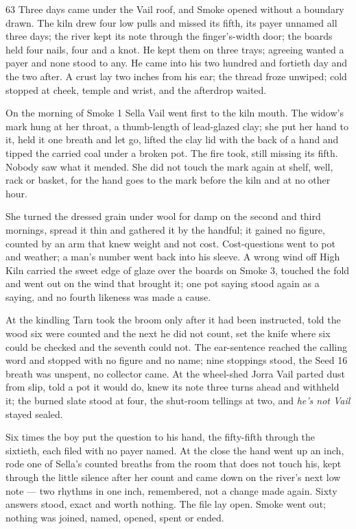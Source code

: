 \begin{CRchronicle}{63}
Three days came under the Vail roof, and Smoke opened without a boundary drawn. The kiln drew four low pulls and missed its fifth, its payer unnamed all three days; the river kept its note through the finger’s-width door; the boards held four nails, four and a knot. He kept them on three trays; agreeing wanted a payer and none stood to any. He came into his two hundred and fortieth day and the two after. A crust lay two inches from his ear; the thread froze unwiped; cold stopped at cheek, temple and wrist, and the afterdrop waited.

On the morning of Smoke 1 Sella Vail went first to the kiln mouth. The widow’s mark hung at her throat, a thumb-length of lead-glazed clay; she put her hand to it, held it one breath and let go, lifted the clay lid with the back of a hand and tipped the carried coal under a broken pot. The fire took, still missing its fifth. Nobody saw what it mended. She did not touch the mark again at shelf, well, rack or basket, for the hand goes to the mark before the kiln and at no other hour.

She turned the dressed grain under wool for damp on the second and third mornings, spread it thin and gathered it by the handful; it gained no figure, counted by an arm that knew weight and not cost. Cost-questions went to pot and weather; a man’s number went back into his sleeve. A wrong wind off High Kiln carried the sweet edge of glaze over the boards on Smoke 3, touched the fold and went out on the wind that brought it; one pot saying stood again as a saying, and no fourth likeness was made a cause.

At the kindling Tarn took the broom only after it had been instructed, told the wood six were counted and the next he did not count, set the knife where six could be checked and the seventh could not. The ear-sentence reached the calling word and stopped with no figure and no name; nine stoppings stood, the Seed 16 breath was unspent, no collector came. At the wheel-shed Jorra Vail parted dust from slip, told a pot it would do, knew its note three turns ahead and withheld it; the burned slate stood at four, the shut-room tellings at two, and \emph{he’s not Vail} stayed sealed.

Six times the boy put the question to his hand, the fifty-fifth through the sixtieth, each filed with no payer named. At the close the hand went up an inch, rode one of Sella’s counted breaths from the room that does not touch his, kept through the little silence after her count and came down on the river’s next low note — two rhythms in one inch, remembered, not a change made again. Sixty answers stood, exact and worth nothing. The file lay open. Smoke went out; nothing was joined, named, opened, spent or ended.
\end{CRchronicle}
